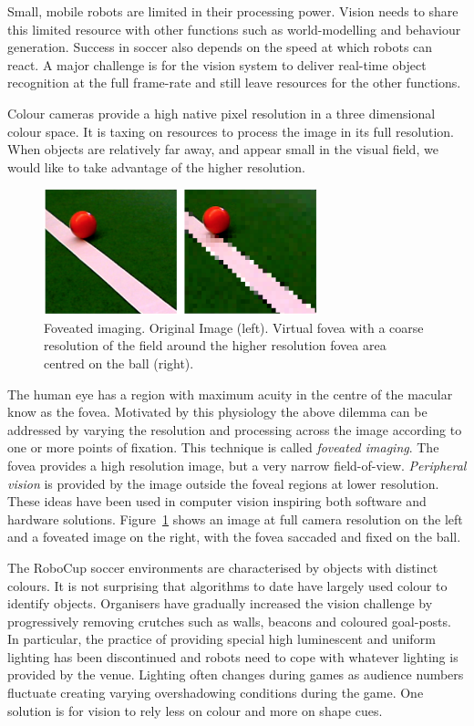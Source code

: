 \documentclass[runningheads,a4paper]{llncs}
\begin{document}
Small, mobile robots are limited in their processing power. Vision
needs to share this limited resource with other functions such as
world-modelling and behaviour generation. Success in soccer also depends on the
speed at which robots can react. A major challenge is for the vision system to
deliver real-time object recognition at the full frame-rate and still leave
resources for the other functions. 

Colour cameras provide a high native pixel resolution in a three
dimensional colour space. It is taxing on resources to process the image in its
full resolution. When objects are relatively far away, and appear small in the
visual field, we would like to take advantage of the higher resolution. 

\begin{figure}
\centering
\includegraphics[width=0.71\textwidth]{figures/figFov}
\caption{Foveated imaging. Original Image (left). Virtual fovea with a coarse resolution of the field around the higher resolution fovea area centred on the ball (right).} \label{figFov}
\end{figure}

The human eye has a region with maximum acuity in the centre of the macular know
as the fovea. Motivated by this physiology the above dilemma can be addressed by
varying the resolution and processing across the image according to one or more
points of fixation. This technique is called \emph{foveated imaging}. The fovea
provides a high resolution image, but a very narrow field-of-view.
\emph{Peripheral vision} is provided by the image outside the foveal regions at
lower resolution. These ideas have been used in computer vision inspiring both
software and hardware solutions.\cite{724279} Figure~\ref{figFov} shows an
image at full camera resolution on the left and a foveated image on the right,
with the fovea saccaded and fixed on the ball. 

The RoboCup soccer environments are characterised by objects with distinct colours. It is not surprising that algorithms to date have largely used colour to identify objects. Organisers have gradually increased the vision challenge by progressively removing crutches such as walls, beacons and coloured goal-posts. In particular, the practice of providing special high luminescent and uniform lighting has been discontinued and robots need to cope with whatever lighting is provided by the venue. Lighting often changes during games as audience numbers fluctuate creating varying overshadowing conditions during the game. One solution is for vision to rely less on colour and more on shape cues. 
\end{document}
